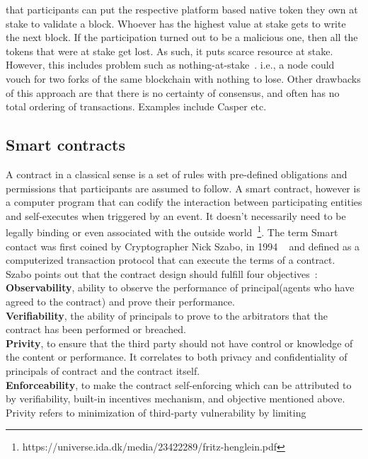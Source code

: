 \begin{itemize}
		that participants can put the respective platform based native token
		they own at stake to validate a block. Whoever has the highest value at
		stake gets to write the next block. If the participation turned out to
		be a malicious one, then all the tokens that were at stake get lost. As
		such, it puts scarce resource at stake. However, this includes problem
		such as nothing-at-stake~\cite{houy2014will}. i.e., a node could vouch for two forks
		of the same blockchain with nothing to lose. Other drawbacks of this
		approach are that there is no certainty of consensus, and often has no
		total ordering of transactions. Examples include Casper etc. 
\end{itemize}

\subsection{Smart contracts}
A contract in a classical sense is a set of rules with pre-defined obligations
and permissions that participants are assumed to follow. 
A smart contract, however is a computer program that can codify the
interaction between participating entities and self-executes when triggered by
an event. It doesn't necessarily need to be legally binding or even associated
with the outside world~\footnote{https://universe.ida.dk/media/23422289/fritz-henglein.pdf}.
The term Smart contact was first coined by Cryptographer Nick Szabo, in 1994
~\cite{SzaboSmart1994} and defined as a computerized transaction protocol that
can execute the terms of a contract. Szabo points out that the contract
design should fulfill four objectives~\cite{szabo1996smart}: \\
\textbf{Observability}, ability to observe the performance of principal(agents
who have agreed to the contract) and prove their performance.\\
\textbf{Verifiability}, the ability of principals to prove to the arbitrators
that the contract has been performed or breached. \\ 
\textbf{Privity}, to ensure that the third party should not have control or
knowledge of the content or performance. It correlates to both privacy and
confidentiality of principals of contract and the contract itself. \\
\textbf{Enforceability}, to make the contract self-enforcing which can be
attributed to by verifiability, built-in incentives mechanism, and objective
mentioned above. \\
Privity refers to minimization of third-party vulnerability by limiting
